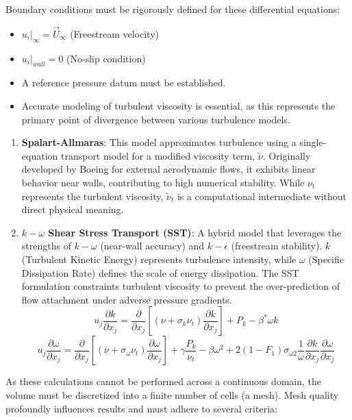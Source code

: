 \documentclass[a4paper]{article}
\begin{document}
	Boundary conditions must be rigorously defined for these differential equations:
	\begin{itemize}
		\item $u_i|_\infty = \vec U_\infty$ (Freestream velocity)
		\item $u_i|_{wall} = 0$ (No-slip condition)
		\item A reference pressure datum must be established.
		\item Accurate modeling of turbulent viscosity is essential, as this represents the primary point of divergence between various turbulence models.
	\end{itemize}
	\begin{enumerate}
		\item \textbf{Spalart-Allmaras}: This model approximates turbulence using a single-equation transport model for a modified viscosity term, $\tilde \nu$.
		Originally developed by Boeing for external aerodynamic flows, it exhibits linear behavior near walls, contributing to high numerical stability.
		While $\nu_t$ represents the turbulent viscosity, $\tilde \nu_t$ is a computational intermediate without direct physical meaning.
		\item \textbf{$k-\omega$ Shear Stress Transport (SST)}: A hybrid model that leverages the strengths of $k-\omega$ (near-wall accuracy) and $k-\epsilon$ (freestream stability).
		$k$ (Turbulent Kinetic Energy) represents turbulence intensity, while $\omega$ (Specific Dissipation Rate) defines the scale of energy dissipation.
		The SST formulation constraints turbulent viscosity to prevent the over-prediction of flow attachment under adverse pressure gradients.
		\[u_j\frac{\partial k}{\partial x_j}= \frac{\partial}{\partial x_j}\left[(\nu+ \sigma_k\nu_t)\frac{\partial k}{\partial x_j}\right]+ P_k - \beta ^* \omega k\]
		\[u_j \frac{\partial \omega}{\partial x_j} = \frac{\partial}{\partial x_j} \left[ \left( \nu + \sigma_{\omega} \nu_t \right) \frac{\partial \omega}{\partial x_j} \right] + \gamma \frac{P_k}{\nu_t} - \beta \omega^2 + 2 (1 - F_1) \sigma_{\omega 2} \frac{1}{\omega} \frac{\partial k}{\partial x_j} \frac{\partial \omega}{\partial x_j}\]
	\end{enumerate}
	As these calculations cannot be performed across a continuous domain, the volume must be discretized into a finite number of cells (a mesh).
	Mesh quality profoundly influences results and must adhere to several criteria:
\end{document}
